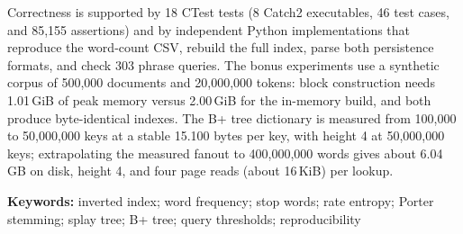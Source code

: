Correctness is supported by 18 CTest tests (8 Catch2 executables, 46 test
cases, and 85,155 assertions) and by independent Python implementations that
reproduce the word-count CSV, rebuild the full index, parse both persistence
formats, and check 303 phrase queries. The bonus experiments use a synthetic
corpus of 500,000 documents and 20,000,000 tokens: block construction needs
1.01\,GiB of peak memory versus 2.00\,GiB for the in-memory build, and both
produce byte-identical indexes. The B+ tree dictionary is measured from
100,000 to 50,000,000 keys at a stable 15.100 bytes per key, with height 4 at
50,000,000 keys; extrapolating the measured fanout to 400,000,000 words gives
about 6.04\,GB on disk, height 4, and four page reads (about 16\,KiB) per
lookup.

\vspace{0.8em}
\noindent\textbf{Keywords:} inverted index; word frequency; stop words; rate
entropy; Porter stemming; splay tree; B+ tree; query thresholds;
reproducibility
